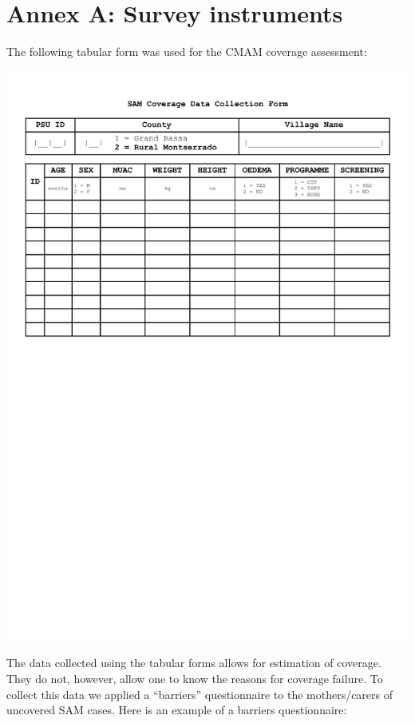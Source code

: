 \documentclass[12pt,a4paper]{article}
\begin{document}
\newpage

\hypertarget{annex-a-survey-instruments}{%
\section*{Annex A: Survey instruments}\label{annex-a-survey-instruments}}

The following tabular form was used for the CMAM coverage assessment:

\begin{center}\includegraphics[width=0.9\linewidth]{forms/samForm} \end{center}

The data collected using the tabular forms allows for estimation of coverage. They do not, however, allow one to know the reasons for coverage failure. To collect this data we applied a ``barriers'' questionnaire to the mothers/carers of uncovered SAM cases. Here is an example of a barriers questionnaire:
\end{document}
